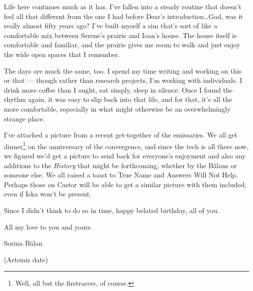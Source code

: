 Life here continues much as it has. I've fallen into a steady routine that doesn't feel all that different from the one I had before Dear's introduction\ldots{}God, was it really almost fifty years ago? I've built myself a sim that's sort of like a comfortable mix between Serene's prairie and Ioan's house. The house itself is comfortable and familiar, and the prairie gives me room to walk and just enjoy the wide open spaces that I remember.

The days are much the same, too. I spend my time writing and working on this or that — though rather than research projects, I'm working with individuals. I drink more coffee than I ought, eat simply, sleep in silence. Once I found the rhythm again, it was easy to slip back into that life, and for that, it's all the more comfortable, especially in what might otherwise be an overwhelmingly strange place.

I've attached a picture from a recent get-together of the emissaries. We all get dinner\footnote{Well, all but the firstracers, of course.} on the anniversary of the convergence, and since the tech is all there now, we figured we'd get a picture to send back for everyone's enjoyment and also any additions to the \emph{History} that might be forthcoming, whether by the Bălans or someone else. We all raised a toast to True Name and Answers Will Not Help. Perhaps those on Castor will be able to get a similar picture with them included, even if Iska won't be present.

Since I didn't think to do so in time, happy belated birthday, all of you.

All my love to you and yours.

Sorina Bălan

(Artemis date)
